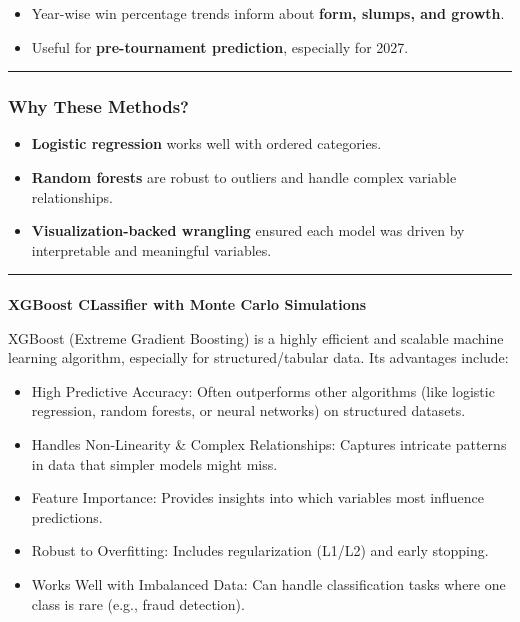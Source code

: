 \documentclass[
  letterpaper,
  DIV=11,
  numbers=noendperiod]{scrartcl}
\makeatletter
\let\oldparagraph\paragraph
\renewcommand{\paragraph}{
    \@ifstar
      \xxxParagraphStar
      \xxxParagraphNoStar
  }
\newcommand{\xxxParagraphStar}[1]{\oldparagraph*{#1}\mbox{}}
\newcommand{\xxxParagraphNoStar}[1]{\oldparagraph{#1}\mbox{}}
\providecommand{\tightlist}{%
  \setlength{\itemsep}{0pt}\setlength{\parskip}{0pt}}\usepackage{longtable,booktabs,array}
\makeatother
\begin{document}
\begin{itemize}
\tightlist
\item
  Year-wise win percentage trends inform about \textbf{form, slumps, and
  growth}.
\item
  Useful for \textbf{pre-tournament prediction}, especially for 2027.
\end{itemize}

\begin{center}\rule{0.5\linewidth}{0.5pt}\end{center}

\subsubsection{\texorpdfstring{\textbf{Why These
Methods?}}{Why These Methods?}}\label{why-these-methods}

\begin{itemize}
\tightlist
\item
  \textbf{Logistic regression} works well with ordered categories.
\item
  \textbf{Random forests} are robust to outliers and handle complex
  variable relationships.
\item
  \textbf{Visualization-backed wrangling} ensured each model was driven
  by interpretable and meaningful variables.
\end{itemize}

\begin{center}\rule{0.5\linewidth}{0.5pt}\end{center}

\paragraph{\texorpdfstring{\textbf{XGBoost CLassifier with Monte Carlo
Simulations}}{XGBoost CLassifier with Monte Carlo Simulations}}\label{xgboost-classifier-with-monte-carlo-simulations}

XGBoost (Extreme Gradient Boosting) is a highly efficient and scalable
machine learning algorithm, especially for structured/tabular data. Its
advantages include:

\begin{itemize}
\item
  High Predictive Accuracy: Often outperforms other algorithms (like
  logistic regression, random forests, or neural networks) on structured
  datasets.
\item
  Handles Non-Linearity \& Complex Relationships: Captures intricate
  patterns in data that simpler models might miss.
\item
  Feature Importance: Provides insights into which variables most
  influence predictions.
\item
  Robust to Overfitting: Includes regularization (L1/L2) and early
  stopping.
\item
  Works Well with Imbalanced Data: Can handle classification tasks where
  one class is rare (e.g., fraud detection).
\end{itemize}
\end{document}
